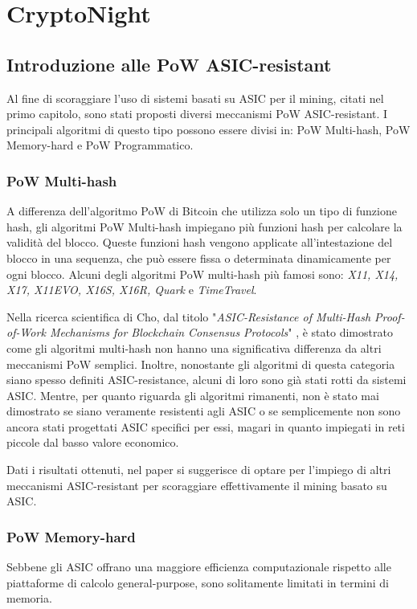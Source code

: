 \chapter{CryptoNight}
\section{Introduzione alle PoW ASIC-resistant}
Al fine di scoraggiare l'uso di sistemi basati su ASIC per il mining, citati nel primo capitolo, sono stati proposti diversi meccanismi PoW ASIC-resistant.
I principali algoritmi di questo tipo possono essere divisi in: PoW Multi-hash, PoW Memory-hard e PoW Programmatico.

\subsection{PoW Multi-hash}
A differenza dell'algoritmo PoW di Bitcoin che utilizza solo un tipo di funzione hash, gli algoritmi PoW Multi-hash impiegano più funzioni hash per calcolare la validità del blocco. Queste funzioni hash vengono applicate all'intestazione del blocco in una sequenza, che può essere fissa o determinata dinamicamente per ogni blocco. 
Alcuni degli algoritmi PoW multi-hash più famosi sono: \textit{X11, X14, X17, X11EVO, X16S, X16R, Quark} e \textit{TimeTravel}.

Nella ricerca scientifica di Cho, dal titolo "\textit{ASIC-Resistance of Multi-Hash Proof-of-Work Mechanisms for Blockchain Consensus Protocols}" \cite{asic1}, è stato dimostrato come gli algoritmi multi-hash non hanno una significativa differenza da altri meccanismi PoW semplici.
Inoltre, nonostante gli algoritmi di questa categoria siano spesso definiti ASIC-resistance, alcuni di loro sono già stati rotti da sistemi ASIC.
Mentre, per quanto riguarda gli algoritmi rimanenti, non è stato mai dimostrato se siano veramente resistenti agli ASIC o se semplicemente non sono ancora stati progettati ASIC specifici per essi, magari in quanto impiegati in reti piccole dal basso valore economico.

Dati i risultati ottenuti, nel paper si suggerisce di optare per l'impiego di altri meccanismi ASIC-resistant per scoraggiare effettivamente il mining basato su ASIC.


\subsection{PoW Memory-hard}
Sebbene gli ASIC offrano una maggiore efficienza computazionale rispetto alle piattaforme di calcolo general-purpose, sono solitamente limitati in termini di memoria.
    
